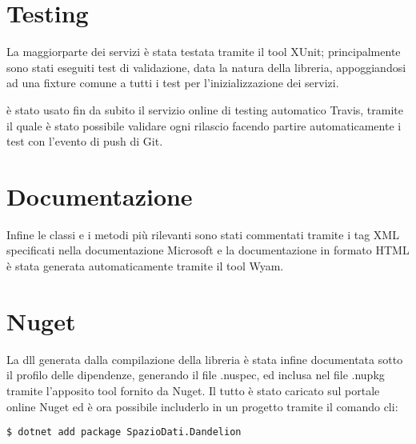 \section{Testing}
La maggiorparte dei servizi è stata testata tramite il tool XUnit; principalmente sono stati eseguiti test di validazione, data la natura della libreria, appoggiandosi 
ad una fixture comune a tutti i test per l'inizializzazione dei servizi.

è stato usato fin da subito il servizio online di testing automatico Travis, tramite il quale è stato possibile validare ogni rilascio facendo 
partire automaticamente i test con l'evento di push di Git. 

\section{Documentazione}
Infine le classi e i metodi più rilevanti sono stati commentati tramite i tag XML specificati nella documentazione Microsoft e la documentazione in formato 
HTML è stata generata automaticamente tramite il tool Wyam.

\section{Nuget}
La dll generata dalla compilazione della libreria è stata infine documentata sotto il profilo delle dipendenze, generando il file .nuspec, ed inclusa nel file .nupkg
tramite l'apposito tool fornito da Nuget. Il tutto è stato caricato sul portale online Nuget ed è ora possibile includerlo in un progetto tramite il comando cli:

\begin{lstlisting}[style=TexStyle]
$ dotnet add package SpazioDati.Dandelion
\end{lstlisting}